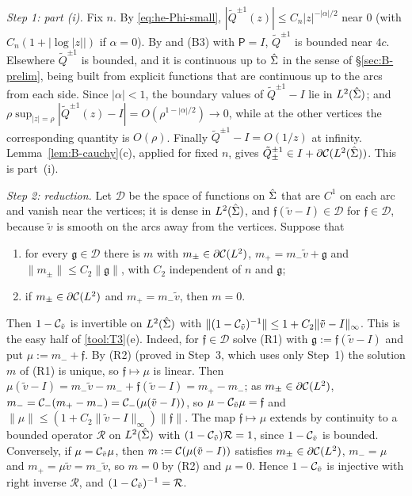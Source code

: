 \emph{Step 1: part (i).} Fix $n$. By \eqref{eq:he-Phi-small}, $|\tilde Q^{\pm1}(z)|\le C_n|z|^{-|\alpha|/2}$ near $0$
(with $C_n(1+|\log|z||)$ if $\alpha=0$). By  and (B3) with $\mathsf P=I$, $\tilde Q^{\pm1}$ is
bounded near $4c$. Elsewhere $\tilde Q^{\pm1}$ is bounded, and it is continuous up to $\hat\Sigma$ in the sense of
\S\ref{sec:B-prelim}, being built from explicit functions that are continuous up to the arcs from each side. Since
$|\alpha|<1$, the boundary values of $\tilde Q^{\pm1}-I$ lie in $L^2(\hat\Sigma)$; and
$\rho\sup_{|z|=\rho}|\tilde Q^{\pm1}(z)-I|=O(\rho^{1-|\alpha|/2})\to0$, while at the other vertices the corresponding
quantity is $O(\rho)$. Finally $\tilde Q^{\pm1}-I=O(1/z)$ at infinity. Lemma~\ref{lem:B-cauchy}(c), applied for fixed $n$,
gives $\tilde Q_\pm^{\pm1}\in I+\partial\mathcal{C}(L^2(\hat\Sigma))$. This is part~(i).

\emph{Step 2: reduction.} Let $\mathcal D$ be the space of functions on $\hat\Sigma$ that are $C^1$ on each arc and vanish
near the vertices; it is dense in $L^2(\hat\Sigma)$, and $\mathfrak f(\tilde v-I)\in\mathcal D$ for $\mathfrak f\in\mathcal D$,
because $\tilde v$ is smooth on the arcs away from the vertices. Suppose that
\begin{enumerate}
\item[(R1)] for every $\mathfrak g\in\mathcal D$ there is $m$ with $m_\pm\in\partial\mathcal{C}(L^2)$, $m_+=m_-\tilde v+\mathfrak g$ and
  $\|m_\pm\|\le C_2\|\mathfrak g\|$, with $C_2$ independent of $n$ and $\mathfrak g$;
\item[(R2)] if $m_\pm\in\partial\mathcal{C}(L^2)$ and $m_+=m_-\tilde v$, then $m=0$.
\end{enumerate}
Then $1-\mathcal{C}_{\tilde v}$ is invertible on $L^2(\hat\Sigma)$ with $\|(1-\mathcal{C}_{\tilde v})^{-1}\|\le1+C_2\|\tilde v-I\|_\infty$.
This is the easy half of \ref{tool:T3}(e). Indeed, for $\mathfrak f\in\mathcal D$ solve (R1) with $\mathfrak g:=\mathfrak f(\tilde
v-I)$ and put $\mu:=m_-+\mathfrak f$. By (R2) (proved in Step~3, which uses only Step~1) the
solution $m$ of (R1) is unique, so $\mathfrak f\mapsto\mu$ is linear. Then $\mu(\tilde v-I)=m_-\tilde v-m_-+\mathfrak f(\tilde v-I)=m_+-m_-$; as $m_\pm\in\partial\mathcal{C}(L^2)$,
$m_-=\mathcal{C}_-(m_+-m_-)=\mathcal{C}_-(\mu(\tilde v-I))$, so $\mu-\mathcal{C}_{\tilde v}\mu=\mathfrak f$ and $\|\mu\|\le
(1+C_2\|\tilde v-I\|_\infty)\|\mathfrak f\|$. The map $\mathfrak f\mapsto\mu$ extends by continuity to a bounded operator $\mathcal R$
on $L^2(\hat\Sigma)$ with $(1-\mathcal{C}_{\tilde v})\mathcal R=1$, since $1-\mathcal{C}_{\tilde v}$ is bounded. Conversely, if
$\mu=\mathcal{C}_{\tilde v}\mu$, then $m:=\mathcal{C}(\mu(\tilde v-I))$ satisfies $m_\pm\in\partial\mathcal{C}(L^2)$, $m_-=\mu$ and $m_+=\mu\tilde v=m_-\tilde
v$, so $m=0$ by (R2) and $\mu=0$. Hence $1-\mathcal{C}_{\tilde v}$ is injective with right inverse $\mathcal R$, and
$(1-\mathcal{C}_{\tilde v})^{-1}=\mathcal R$.

